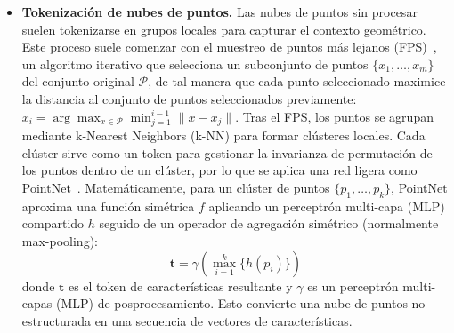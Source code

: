 \documentclass[../../book-main_es.tex]{subfiles}
\begin{document}
\begin{itemize}
\item \textbf{Tokenización de nubes de puntos.} 
Las nubes de puntos sin procesar suelen tokenizarse en grupos locales para capturar
el contexto geométrico. Este proceso suele comenzar con el muestreo de puntos más lejanos (FPS)~\cite{eldar1997farthest},
un algoritmo iterativo que selecciona un subconjunto de puntos $\{x_1, \dots, x_m\}$
del conjunto original $\mathcal{P}$, de tal manera que cada punto seleccionado maximice
la distancia al conjunto de puntos seleccionados previamente:
$x_{i} = \arg\max_{x \in \mathcal{P}} \min_{j=1}^{i-1} \|x - x_j\|$.
Tras el FPS, los puntos se agrupan mediante k-Nearest Neighbors (k-NN) para formar clústeres locales.
Cada clúster sirve como un token para gestionar la invarianza de permutación de los puntos
dentro de un clúster, por lo que se aplica una red ligera como PointNet~\cite{qi2017pointnet}.
Matemáticamente, para un clúster de puntos $\{p_1, \dots, p_k\}$,
PointNet aproxima una función simétrica $f$ aplicando un
perceptrón multi-capa (MLP) compartido $h$ seguido de un operador de agregación simétrico (normalmente max-pooling):
\begin{equation}
    \boldsymbol{t} = \gamma \left( \max_{i=1}^k \{ h(p_i) \} \right)
\end{equation}
donde $\boldsymbol{t}$ es el token de características resultante y $\gamma$ es un perceptrón multi-capas (MLP) de posprocesamiento.
Esto convierte una nube de puntos no estructurada en una secuencia de vectores de características.

    
    

\end{itemize}
\end{document}
